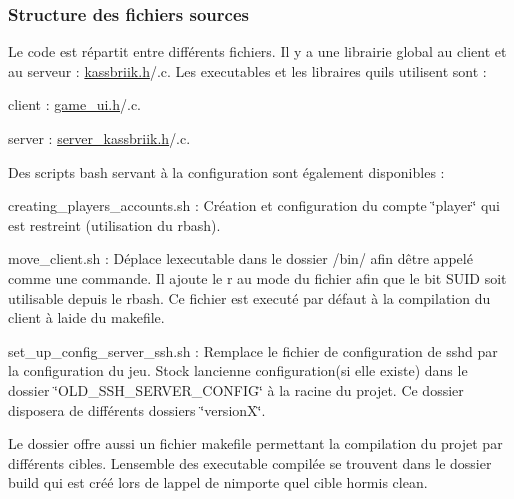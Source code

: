 \subsubsection*{Structure des fichiers sources}

Le code est répartit entre différents fichiers. Il y a une librairie global au client et au serveur \+: \hyperlink{kassbriik_8h}{kassbriik.\+h}/.c. Les executables et les libraires qu\textquotesingle{}ils utilisent sont \+:
\begin{DoxyItemize}
\item client \+: \hyperlink{game__ui_8h}{game\+\_\+ui.\+h}/.c.
\item server \+: \hyperlink{server__kassbriik_8h}{server\+\_\+kassbriik.\+h}/.c.
\end{DoxyItemize}

Des scripts bash servant à la configuration sont également disponibles \+:
\begin{DoxyItemize}
\item creating\+\_\+players\+\_\+accounts.\+sh \+: Création et configuration du compte \char`\"{}player\char`\"{} qui est restreint (utilisation du rbash).
\item move\+\_\+client.\+sh \+: Déplace l\textquotesingle{}executable dans le dossier /bin/ afin d\textquotesingle{}être appelé comme une commande. Il ajoute le r au mode du fichier afin que le bit S\+U\+ID soit utilisable depuis le rbash. Ce fichier est executé par défaut à la compilation du client à l\textquotesingle{}aide du makefile.
\item set\+\_\+up\+\_\+config\+\_\+server\+\_\+ssh.\+sh \+: Remplace le fichier de configuration de sshd par la configuration du jeu. Stock l\textquotesingle{}ancienne configuration(si elle existe) dans le dossier \char`\"{}\+O\+L\+D\+\_\+\+S\+S\+H\+\_\+\+S\+E\+R\+V\+E\+R\+\_\+\+C\+O\+N\+F\+I\+G\char`\"{} à la racine du projet. Ce dossier disposera de différents dossiers \char`\"{}version\+X\char`\"{}.
\end{DoxyItemize}

Le dossier offre aussi un fichier makefile permettant la compilation du projet par différents cibles. L\textquotesingle{}ensemble des executable compilée se trouvent dans le dossier build qui est créé lors de l\textquotesingle{}appel de n\textquotesingle{}importe quel cible hormis clean.

